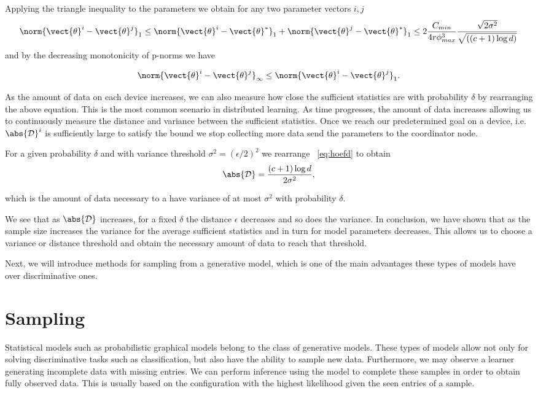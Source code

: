 Applying the triangle inequality to the parameters we obtain for any two parameter vectors $i,j$
\begin{equation}
    \norm{\vect{\theta}^i- \vect{\theta}^j}_1 \leq  \norm{\vect{\theta}^i - \vect{\theta}^*}_1  +  \norm{\vect{\theta}^j- \vect{\theta}^*}_1 \leq 2 \frac{C_{min}}{4r\phi^3_{max}} \frac{\sqrt{2\sigma^2}}{\sqrt{((c+1) \log d)}}
\end{equation}
and by the decreasing monotonicity of p-norms \cite{raissouli2010various} we have

\begin{equation}
    \norm{\vect{\theta}^i- \vect{\theta}^j}_{\infty}  \leq \norm{\vect{\theta}^i- \vect{\theta}^j}_1.
\end{equation}

As the amount of data on each device increases, we can also measure how close the sufficient statistics are with probability $\delta$ by rearranging the above equation. 
This is the most common scenario in distributed learning. 
As time progresses, the amount of data increases allowing us to continuously measure the distance and variance between the sufficient statistics.
Once we reach our predetermined goal on a device, i.e. $\abs{\mathcal{D}}^i$ is sufficiently large to satisfy the bound we stop collecting more data send the parameters to the coordinator node.

For a given probability $\delta$ and with variance threshold $\sigma^2 = (\epsilon/2)^2$ we rearrange \eq~\ref{eq:hoefd} to obtain 
\begin{equation}
    \abs{\mathcal{D}} = \frac{(c+1) \log d}{2 \sigma^2},
\end{equation}

which is the amount of data necessary to a have variance of at most $\sigma^2$ with probability $\delta$.

We see that as $\abs{\mathcal{D}}$ increases, for a fixed $\delta$ the distance $\epsilon$ decreases and so does the variance. 
In conclusion, we have shown that as the sample size increases the variance for the average sufficient statistics and in turn for model parameters decreases.
This allows us to choose a variance or distance threshold and obtain the necessary amount of data to reach that threshold.

Next, we will introduce methods for sampling from a generative model, which is one of the main advantages these types of models have over discriminative ones.

\section{Sampling}
\label{sec:sampling}
Statistical models such as probabilistic graphical models belong to the class of generative models.
These types of models allow not only for solving discriminative tasks such as classification, but also have the ability to sample new data.
Furthermore, we may observe a learner generating incomplete data with missing entries.
We can perform inference using the model to complete these samples in order to obtain fully observed data.
This is usually based on the configuration with the highest likelihood given the seen entries of a sample.

